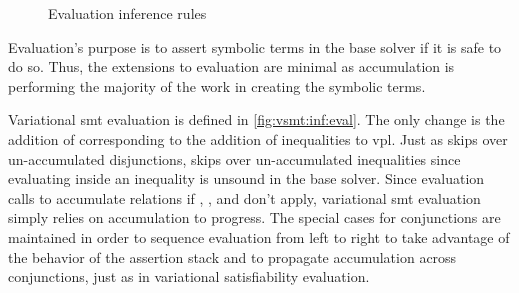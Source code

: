 \label{section:vsmt:evaluation}
%
\begin{figure}
  
  \caption{Evaluation inference rules}%
  \label{fig:vsmt:inf:eval}
\end{figure}
%
Evaluation's purpose is to assert symbolic terms in the base solver if it is
safe to do so. Thus, the extensions to evaluation are minimal as accumulation is
performing the majority of the work in creating the symbolic terms.

Variational \ac{smt} evaluation is defined in \autoref{fig:vsmt:inf:eval}. The
only change is the addition of \evInEq{} corresponding to the addition of
inequalities to \ac{vpl}. Just as \evOr{} skips over un-accumulated
disjunctions, \evInEq{} skips over un-accumulated inequalities since evaluating
inside an inequality is unsound in the base solver. Since evaluation calls
\evAcc{} to accumulate relations if \evAndL{}, \evAndR{}, and \evAnd{} don't
apply, variational \ac{smt} evaluation simply relies on accumulation to
progress. The special cases for conjunctions are maintained in order to sequence
evaluation from left to right to take advantage of the behavior of the assertion
stack and to propagate accumulation across conjunctions, just as in variational
satisfiability evaluation.


